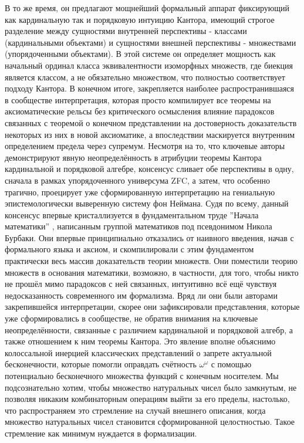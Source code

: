 \documentclass[12pt]{article}
\begin{document}
В то же время, он предлагают мощнейший формальный аппарат фиксирующий как кардинальную так и порядковую интуицию Кантора, имеющий строгое разделение между сущностями внутренней перспективы - классами (кардинальными объектами) и сущностями внешней перспективы - множествами (упорядоченными объектами). В этой системе он определяет мощность как начальный ординал класса эквивалентности изоморфных множеств, где биекция является классом, а не обязательно множеством, что полностью соответствует подходу Кантора. В конечном итоге, закрепляется наиболее распространившаяся в сообществе интерпретация, которая просто компилирует все теоремы на аксиоматические рельсы без критического осмысления влияние парадоксов связанных с теоремой о конечном представлении на достоверность доказательств некоторых из них в новой аксиоматике, а впоследствии маскируется внутренним определением предела через супремум. Несмотря на то, что ключевые авторы демонстрируют явную неопределённость в атрибуции теоремы Кантора кардинальной и порядковой алгебре, консенсус сливает обе перспективы в одну, сначала в рамках упорядоченного универсума ZFC, а затем, что особенно трагично, проецирует уже сформированную интерпретацию на гениальную эпистемологически выверенную систему фон Неймана. Судя по всему, данный консенсус впервые кристаллизуется в фундаментальном труде ''Начала математики'' \cite{burbaki-set-theory}, написанным группой математиков под псевдонимом Никола Бурбаки. Они впервые принципиально отказались от наивного введения, начав с формального языка и аксиом, и скомпилировали с этим фундаментом практически весь массив доказательств теории множеств. Они поместили теорию множеств в основания математики, возможно, в частности, для того, чтобы никто не прошёл мимо парадоксов с ней связанных, интуитивно всё ещё чувствуя недосказанность современного им формализма. Вряд ли они были авторами закрепившейся интерпретации, скорее они зафиксировали представления, которые уже сформировались в сообществе, не обратив внимания на ключевые неопределённости, связанные с различием кардинальной и порядковой алгебр, а также отношением к ним теоремы Кантора. Это явление вполне объяснимо колоссальной инерцией классических представлений о запрете актуальной бесконечности, которые помогли оправдать счётность $\omega^{\omega}$ с помощью потенциально бесконечного множества функций с конечным носителем. Мы подсознательно хотим, чтобы множество натуральных чисел было замкнутым, не позволяя никаким комбинаторным операциям выйти за его пределы, настолько, что распространяем это стремление на случай внешнего описания, когда множество натуральных чисел становится сформированной целостностью. Такое стремление как минимум нуждается в формализации.
\end{document}
